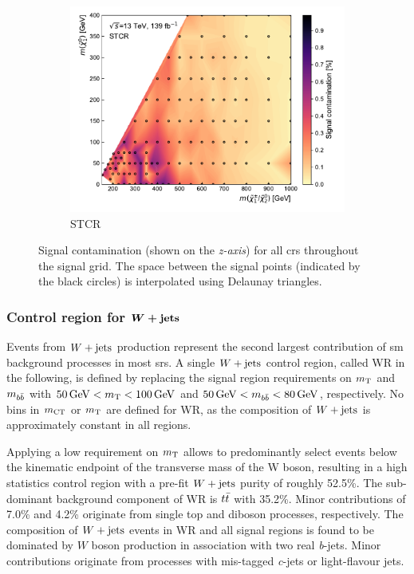 \begin{figure}
\begin{subfigure}[b]{0.5\linewidth}
		\centering\includegraphics[width=1.0\textwidth]{signal_contamination/plot_STCR}
		\caption{STCR\label{fig:signal_contaminations_STCR}}
	\end{subfigure}\hfill

	\caption{Signal contamination (shown on the \textit{z-axis}) for all \glspl{cr} throughout the signal grid. The space between the signal points (indicated by the black circles) is interpolated using Delaunay triangles.}
	\label{fig:signal_contamination_CR}
\end{figure}

\subsubsection[Control region for $\wjets$]{Control region for $\boldsymbol{W+\mathrm{jets}}$}

Events from $\wjets$ production represent the second largest contribution of \gls{sm} background processes in most \glspl{sr}. A single $\wjets$ control region, called WR in the following, is defined by replacing the signal region requirements on $m_{\textrm{T}}$ and $m_{b\bar{b}}$ with $\SI{50}{\GeV} < \mt < \SI{100}{\GeV}$  and $\SI{50}{\GeV} < \mbb < \SI{80}{\GeV}$, respectively. No bins in $m_{\textrm{CT}}$ or $m_{\textrm{T}}$ are defined for WR, as the composition of $\wjets$ is approximately constant in all regions.

Applying a low requirement on $m_{\textrm{T}}$ allows to predominantly select events below the kinematic endpoint of the transverse mass of the W boson, resulting in a high statistics control region with a pre-fit $\wjets$ purity of roughly 52.5\%. The sub-dominant background component of WR is $t\bar{t}$ with 35.2\%. Minor contributions of 7.0\% and 4.2\% originate from single top and diboson processes, respectively. The composition of $\wjets$ events in WR and all signal regions is found to be dominated by $W$ boson production in association with two real \textit{b}-jets. Minor contributions originate from processes with mis-tagged \textit{c}-jets or light-flavour jets.

